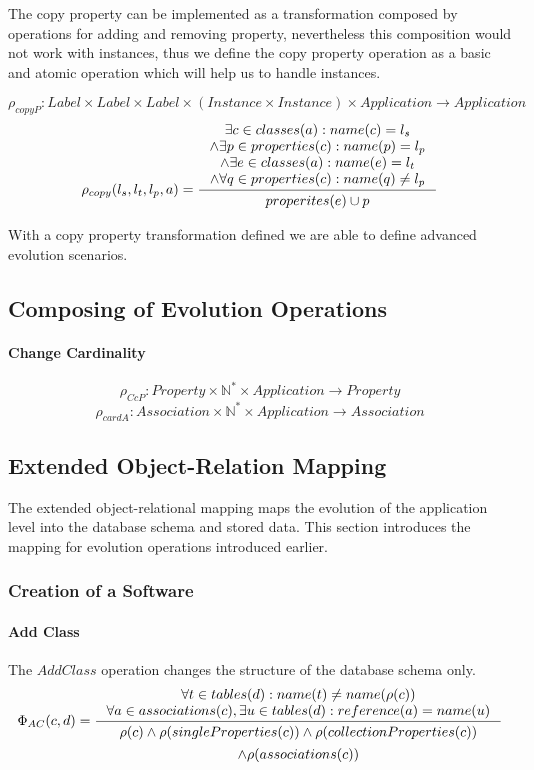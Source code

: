 \documentclass[11pt]{article}
\begin{document}
The copy property can be implemented as a transformation composed by operations for adding and removing property, nevertheless this composition would not work with instances, thus we define the copy property operation as a basic and atomic operation which will help us to handle instances.

$$\rho_{copyP} : Label \times Label \times Label \times (Instance \times Instance) \times Application \rightarrow Application $$
\begin{equation*}
	\rho_{copy}(l_s, l_t, l_p, a) = \inference{\exists c \in classes(a) : name(c) = l_s \\ \wedge \exists p \in properties(c) : name(p) = l_p \\ \wedge \exists e \in classes(a) : name(e) = l_t  \\ \wedge \forall q \in properties(c) : name(q) \neq l_p}{\begin{gathered}
properites(e) \cup p 
\end{gathered}
}
\end{equation*}

With a copy property transformation defined we are able to define advanced evolution scenarios.

\subsection{Composing of Evolution Operations}


\paragraph{Change Cardinality}
$$\rho_{CcP} : Property \times \mathbb{N^{*}} \times Application \rightarrow Property $$
$$\rho_{cardA} : Association \times \mathbb{N^{*}} \times Application \rightarrow Association $$

\subsection{Extended Object-Relation Mapping}
The extended object-relational mapping maps the evolution of the application level into the database schema and stored data. This section introduces the mapping for evolution operations introduced earlier.

\subsubsection{Creation of a Software}
\paragraph{Add Class} The $AddClass$ operation changes the structure of the database schema only.
$$
\Phi_{AC}(c, d) = \inference{ \forall t \in tables(d) : name(t) \neq name(\rho(c)) \\
	\forall a \in associations(c), \exists u \in  tables(d) : reference(a) = name(u) 
}{
\begin{gathered}
  \rho(c) \wedge \rho(singleProperties(c)) \wedge \rho(collectionProperties(c)) \\ \wedge \rho(associations(c))
\end{gathered}
}
$$
\end{document}
